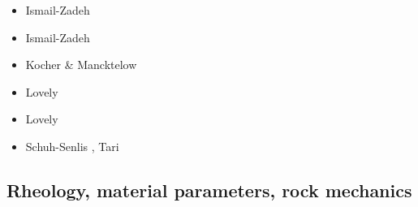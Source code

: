 \begin{scriptsize}
\begin{itemize}
\item[\twothousandone] Ismail-Zadeh \etal \cite{istv01}
\item[\twothousandfour] Ismail-Zadeh \etal \cite{istt04}
\item[\twothousandfive] Kocher \& Mancktelow \cite{koma05}
\item[\twothousandtwelve] Lovely \etal \cite{lofg12}
\item[\twothousandeighteen] Lovely \etal \cite{lojm18}
\item[\twothousandtwenty] Schuh-Senlis \etal \cite{sctc20}, Tari \etal \cite{taas20}
\end{itemize}
\end{scriptsize}

\subsection{Rheology, material parameters, rock mechanics}


